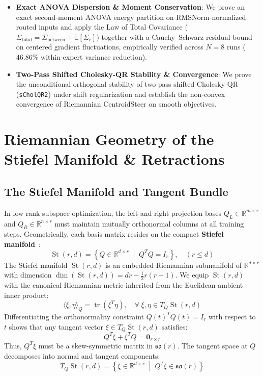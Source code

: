\documentclass[10pt,twocolumn,letterpaper]{article}
\begin{document}
\begin{itemize}
    \item \textbf{Exact ANOVA Dispersion \& Moment Conservation}: We prove an exact second-moment ANOVA energy partition on RMSNorm-normalized routed inputs and apply the Law of Total Covariance ($\Sigma_{\text{total}} = \Sigma_{\text{between}} + \mathbb{E}[\Sigma_e]$) together with a Cauchy--Schwarz residual bound on centered gradient fluctuations, empirically verified across $N=8$ runs ($46.86\%$ within-expert variance reduction).
    \item \textbf{Two-Pass Shifted Cholesky-QR Stability \& Convergence}: We prove the unconditional orthogonal stability of two-pass shifted Cholesky-QR (\texttt{sCholQR2}) under shift regularization and establish the non-convex convergence of Riemannian CentroidSteer on smooth objectives.
\end{itemize}

\section{Riemannian Geometry of the Stiefel Manifold \& Retractions}

\subsection{The Stiefel Manifold and Tangent Bundle}

In low-rank subspace optimization, the left and right projection bases $Q_L \in \mathbb{R}^{m \times r}$ and $Q_R \in \mathbb{R}^{n \times r}$ must maintain mutually orthonormal columns at all training steps. Geometrically, each basis matrix resides on the compact \textbf{Stiefel manifold}~\cite{edelman1998geometry,absil2008optimization}:
\begin{equation}
    \operatorname{St}(r, d) = \left\{ Q \in \mathbb{R}^{d \times r} \;\middle|\; Q^T Q = I_r \right\}, \quad (r \le d)
\end{equation}
The Stiefel manifold $\operatorname{St}(r, d)$ is an embedded Riemannian submanifold of $\mathbb{R}^{d \times r}$ with dimension $\operatorname{dim}(\operatorname{St}(r, d)) = d r - \frac{1}{2} r (r+1)$. We equip $\operatorname{St}(r, d)$ with the canonical Riemannian metric inherited from the Euclidean ambient inner product:
\begin{equation}
    \langle \xi, \eta \rangle_Q = \operatorname{tr}\left( \xi^T \eta \right), \quad \forall \; \xi, \eta \in T_Q \operatorname{St}(r, d)
\end{equation}
Differentiating the orthonormality constraint $Q(t)^T Q(t) = I_r$ with respect to $t$ shows that any tangent vector $\xi \in T_Q \operatorname{St}(r, d)$ satisfies:
\begin{equation}
    Q^T \xi + \xi^T Q = \mathbf{0}_{r \times r}
\end{equation}
Thus, $Q^T \xi$ must be a skew-symmetric matrix in $\mathfrak{so}(r)$. The tangent space at $Q$ decomposes into normal and tangent components:
\begin{equation}
    T_Q \operatorname{St}(r, d) = \left\{ \xi \in \mathbb{R}^{d \times r} \;\middle|\; Q^T \xi \in \mathfrak{so}(r) \right\}
\end{equation}
\end{document}
